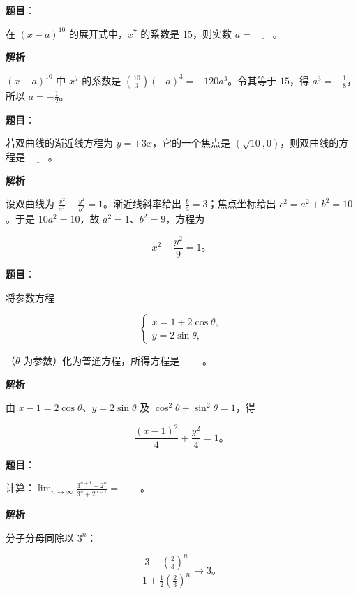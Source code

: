\begin{answer}

\textbf{题目}：

在 $(x-a)^{10}$ 的展开式中，$x^7$ 的系数是 $15$，则实数 $a=\underline{\qquad}$。

\textbf{解析}

$(x-a)^{10}$ 中 $x^7$ 的系数是 $\binom{10}{3}(-a)^3=-120a^3$。令其等于 $15$，得 $a^3=-\frac18$，所以 $a=-\frac12$。


\end{answer}
\begin{answer}

\textbf{题目}：

若双曲线的渐近线方程为 $y=\pm3x$，它的一个焦点是 $(\sqrt{10},0)$，则双曲线的方程是 $\underline{\qquad}$。

\textbf{解析}

设双曲线为 $\frac{x^2}{a^2}-\frac{y^2}{b^2}=1$。渐近线斜率给出 $\frac ba=3$；焦点坐标给出 $c^2=a^2+b^2=10$。于是 $10a^2=10$，故 $a^2=1$、$b^2=9$，方程为

\nopagebreak[4]
\[
x^2-\frac{y^2}{9}=1\mbox{。}
\]


\end{answer}
\begin{answer}

\textbf{题目}：

将参数方程

\nopagebreak[4]
\[
\begin{cases}
x=1+2\cos\theta,\\
y=2\sin\theta,
\end{cases}
\]

（$\theta$ 为参数）化为普通方程，所得方程是 $\underline{\qquad}$。

\textbf{解析}

由 $x-1=2\cos\theta$、$y=2\sin\theta$ 及 $\cos^2\theta+\sin^2\theta=1$，得

\nopagebreak[4]
\[
\frac{(x-1)^2}{4}+\frac{y^2}{4}=1\mbox{。}
\]


\end{answer}
\begin{answer}

\textbf{题目}：

计算：$\displaystyle\lim_{n\to\infty}\frac{3^{n+1}-2^n}{3^n+2^{n-1}}=\underline{\qquad}$。

\textbf{解析}

分子分母同除以 $3^n$：

\nopagebreak[4]
\[
\frac{3-(\frac23)^n}{1+\frac12(\frac23)^n}\longrightarrow 3\mbox{。}
\]


\end{answer}
